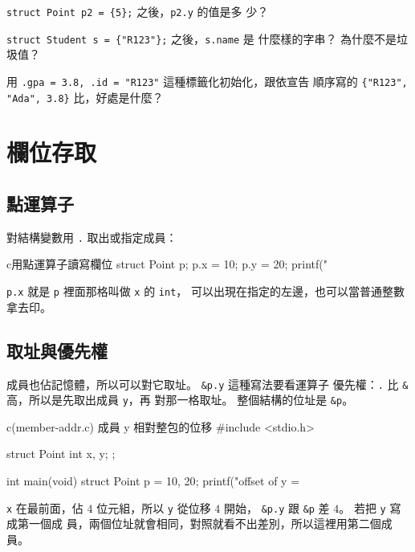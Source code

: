 \begin{drills}[label=drills:struct-init]
\item \texttt{struct Point p2 = \{5\};} 之後，\texttt{p2.y} 的值是多
少？
\item \texttt{struct Student s = \{"R123"\};} 之後，\texttt{s.name} 是
什麼樣的字串？ 為什麼不是垃圾值？
\item 用 \texttt{.gpa = 3.8, .id = "R123"} 這種標籤化初始化，跟依宣告
順序寫的 \texttt{\{"R123", "Ada", 3.8\}} 比，好處是什麼？
\end{drills}

\section{欄位存取}
\label{sec:struct-access}

\subsection{點運算子}

對結構變數用 \texttt{.} 取出或指定成員：

\begin{code}{c}{用點運算子讀寫欄位}
struct Point p;
p.x = 10;
p.y = 20;
printf("%
\end{code}

\texttt{p.x} 就是 \texttt{p} 裡面那格叫做 \texttt{x} 的 \texttt{int}，
可以出現在指定的左邊，也可以當普通整數拿去印。

\subsection{取址與優先權}

成員也佔記憶體，所以可以對它取址。 \texttt{\&p.y} 這種寫法要看運算子
優先權：\texttt{.} 比 \texttt{\&} 高，所以是先取出成員 \texttt{y}，再
對那一格取址。 整個結構的位址是 \texttt{\&p}。

\begin{example}{c}{(member-addr.c) 成員 y 相對整包的位移}
#include <stdio.h>

struct Point {
    int x, y;
};

int main(void) {
    struct Point p = {10, 20};
    printf("offset of y = %
}
\end{example}


\texttt{x} 在最前面，佔 $4$ 位元組，所以 \texttt{y} 從位移 $4$ 開始，
\texttt{\&p.y} 跟 \texttt{\&p} 差 $4$。 若把 \texttt{y} 寫成第一個成
員，兩個位址就會相同，對照就看不出差別，所以這裡用第二個成員。

